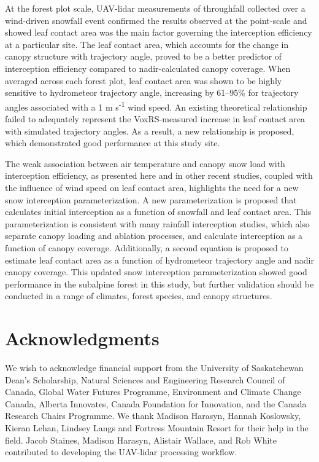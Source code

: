 \documentclass[
  letterpaper,
  DIV=11,
  numbers=noendperiod]{scrartcl}
\begin{document}
At the forest plot scale, UAV-lidar measurements of throughfall
collected over a wind-driven snowfall event confirmed the results
observed at the point-scale and showed leaf contact area was the main
factor governing the interception efficiency at a particular site. The
leaf contact area, which accounts for the change in canopy structure
with trajectory angle, proved to be a better predictor of interception
efficiency compared to nadir-calculated canopy coverage. When averaged
across each forest plot, leaf contact area was shown to be highly
sensitive to hydrometeor trajectory angle, increasing by 61--95\% for
trajectory angles associated with a 1 m s\textsuperscript{-1} wind
speed. An existing theoretical relationship failed to adequately
represent the VoxRS-measured increase in leaf contact area with
simulated trajectory angles. As a result, a new relationship is
proposed, which demonstrated good performance at this study site.

The weak association between air temperature and canopy snow load with
interception efficiency, as presented here and in other recent studies,
coupled with the influence of wind speed on leaf contact area,
highlights the need for a new snow interception parameterization. A new
parameterization is proposed that calculates initial interception as a
function of snowfall and leaf contact area. This parameterization is
consistent with many rainfall interception studies, which also separate
canopy loading and ablation processes, and calculate interception as a
function of canopy coverage. Additionally, a second equation is proposed
to estimate leaf contact area as a function of hydrometeor trajectory
angle and nadir canopy coverage. This updated snow interception
parameterization showed good performance in the subalpine forest in this
study, but further validation should be conducted in a range of
climates, forest species, and canopy structures.

\section{Acknowledgments}\label{acknowledgments}

We wish to acknowledge financial support from the University of
Saskatchewan Dean's Scholarship, Natural Sciences and Engineering
Research Council of Canada, Global Water Futures Programme, Environment
and Climate Change Canada, Alberta Innovates, Canada Foundation for
Innovation, and the Canada Research Chairs Programme. We thank Madison
Harasyn, Hannah Koslowsky, Kieran Lehan, Lindsey Langs and Fortress
Mountain Resort for their help in the field. Jacob Staines, Madison
Harasyn, Alistair Wallace, and Rob White contributed to developing the
UAV-lidar processing workflow.
\end{document}

